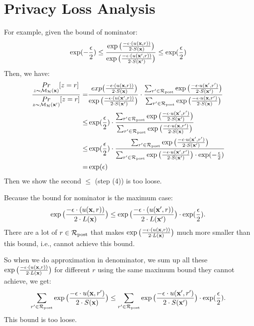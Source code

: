 \documentclass{article}
\begin{document}
\section{Privacy Loss Analysis}


For example, given the bound of nominator:
$$
\exp(-\frac{\epsilon}{2}) \leq \frac {
\exp\big(
  \frac{-\epsilon\cdot(\ux{r})}{2\cdot S(\dataobs)}
  \big)}
  {\exp\big(
  \frac
  {-\epsilon\cdot(\uxadj{r})}{2\cdot S(\dataobs')}
  \big)}
\leq \exp(\frac{\epsilon}{2})
$$
Then, we have:
\begin{align}
\frac{\hexpmechPr{\dataobs}{z = r}}{\hexpmechPr{\dataobs'}{z = r}}
= & \frac {\
  exp\big(
  \frac{-\epsilon\cdot(\ux{r})}{2\cdot S(\dataobs)}
  \big)}
  {\exp\big(
  \frac
  {-\epsilon\cdot(\uxadj{r})}{2\cdot S(\dataobs')}
  \big)} 
  \cdot
  \frac{\unomalizer{\dataobs'}}{\unomalizer{\dataobs}}
  \\
	\leq & \exp(\frac{\epsilon}{2}) 
	\cdot 
	\frac{\unomalizer{\dataobs'}}
	{\unomalizer{\dataobs}}\\
	\leq & \exp(\frac{\epsilon}{2}) 
	\cdot 
	\frac{\unomalizer{\dataobs'}}
	{\unomalizer{\dataobs'}\cdot \exp(-\frac{\epsilon}{2})}\\
	= & \exp(\epsilon)
\end{align}
Then we show the second $\leq$ (step (4)) is too loose.

Because the bound for nominator is the maximum case: 
$$ \exp\big(
  \frac{-\epsilon\cdot(\ux{r})}{2\cdot L(\dataobs)}
  \big)
  \leq
  \exp\big(
  \frac{-\epsilon\cdot(\uxadj{r})}{2\cdot L(\dataobs')}
  \big) 
  \cdot \exp(\frac{\epsilon}{2}).$$
  There are a lot of $r \in \candidateset$ that makes $\exp\big(
  \frac{-\epsilon\cdot(\ux{r})}{2\cdot L(\dataobs)}
  \big)$ much more smaller than this bound, i.e., cannot achieve this bound.

  So when we do approximation in denominator, we sum up all these 
  $\exp\big( \frac{-\epsilon\cdot(\ux{r})}{2\cdot L(\dataobs)} \big)$
  for different $r$ using the same maximum bound they cannot achieve, we get: 
  $$
 \unomalizer{\dataobs}
	\leq
\unomalizer{\dataobs'}\cdot \exp(\frac{\epsilon}{2}).
  $$
  This bound is too loose.

  
\end{document}
